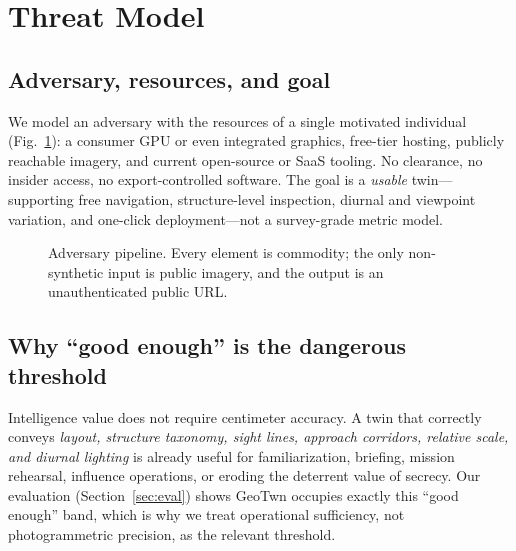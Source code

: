\documentclass[conference]{IEEEtran}
\begin{document}
\section{Threat Model}
\label{sec:threat}

\subsection{Adversary, resources, and goal}
We model an adversary with the resources of a single motivated individual
(Fig.~\ref{fig:threat-adv}): a consumer GPU or even integrated graphics,
free-tier hosting, publicly reachable imagery, and current open-source or SaaS
tooling. No clearance, no insider access, no export-controlled software. The goal
is a \emph{usable} twin---supporting free navigation, structure-level inspection,
diurnal and viewpoint variation, and one-click deployment---not a survey-grade
metric model.

\begin{figure}[t]
\centering
{}
\caption{Adversary pipeline. Every element is commodity; the only non-synthetic
input is public imagery, and the output is an unauthenticated public URL.}
\label{fig:threat-adv}
\end{figure}

\subsection{Why ``good enough'' is the dangerous threshold}
Intelligence value does not require centimeter accuracy. A twin that correctly
conveys \emph{layout, structure taxonomy, sight lines, approach corridors,
relative scale, and diurnal lighting} is already useful for familiarization,
briefing, mission rehearsal, influence operations, or eroding the deterrent value
of secrecy. Our evaluation (Section~\ref{sec:eval}) shows GeoTwn occupies exactly
this ``good enough'' band, which is why we treat operational sufficiency, not
photogrammetric precision, as the relevant threshold.
\end{document}
